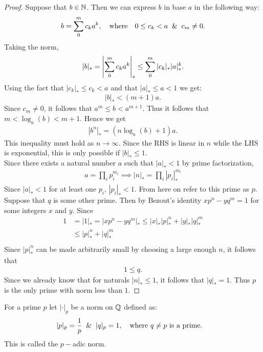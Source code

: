 \begin{proof}
  Suppose that $b\in \mathbb{N}$. Then we can express $b$ in base $a$ in the following way:
  \begin{align*}
    b = \sum_{0}^m c_k a^k,\qq{where} 0\leq c_k<a \And c_m \neq 0. 
  \end{align*}
  Taking the norm,
  \begin{align*}
    |b|_* = \left|\sum_0^m c_k a^k\right|_* \leq \sum_0^m |c_k|_* |a|_*^k.
  \end{align*}
  Using the fact that $|c_k|_* \leq c_k < a$ and that $|a|_* \leq a <1$ we get:
  \begin{align*}
    |b|_* < (m+1)a.
  \end{align*}
  Since $c_m \neq 0$, it follows that $a^m \leq b < a^{m+1}$. Thus it follows that $m < \log_a(b) < m+1$. Hence we get
  \begin{align*}
    |b^n|_* = (n\log_a (b) + 1) a.
  \end{align*}
  This inequality must hold as $n\to \infty$. Since the RHS is linear in $n$ while the LHS is exponential, this is only possible if $|b|_*\leq 1$.\\

  Since there exists a natural number $a$ such that $|a|_*< 1$ by prime factorization,
  \begin{align*}
    a = \prod_{i} p_i^{m_i} \implies |n|_* = \prod_i |p_i|_*^{m_i}
  \end{align*}
  Since $|a|_* < 1$ for at least one $p_i$, $|p_i|_* <1$. From here on refer to this prime as $p$. Suppose that $q$ is some other prime. Then by Bezout's identity $xp^n - yq^m = 1$ for some integers $x$ and $y$. Since
  \begin{align*}
    1 &= |1|_* = |xp^n - yq^m|_* \leq |x|_* |p|_*^n + |y|_* |q|_*^m\\
      &\leq |p|_*^n + |q|_*^m\\
  \end{align*}
  Since $|p|_*^n$ can be made arbitrarily small by choosing a large enough $n$, it follows that
  \begin{align*}
    1 \leq q.
  \end{align*}
  Since we already know that for naturals $|n|_* \leq 1$, it follows that $|q|_* = 1$. Thus $p$ is the only prime with norm less than $1$.
\end{proof}
\begin{definition}
  For a prime $p$ let $|\cdot|_p$ be a norm on $\mathbb{Q}$ defined as:
  \begin{align*}
    |p|_p = \frac{1}{p} \And |q|_p = 1,\qq{where $q\neq p$ is a prime.}
  \end{align*}
  This is called the $p-$adic norm.
\end{definition}
